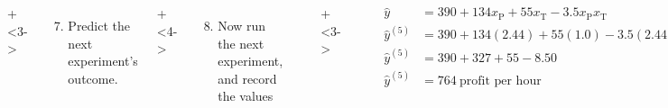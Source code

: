 \begin{frame}
	\vspace{-1.1cm}
	\begin{columns}[T]

			\vspace{1cm}
			\onslide+<3->{
				{\tiny 
					\begin{enumerate}\setcounter{enumi}{6}
						\item	Predict the next experiment's outcome.
					\end{enumerate}
				
				\par}
			}
			
			\vspace{2cm}
			\onslide+<4->{
				{\tiny 
					\begin{enumerate}\setcounter{enumi}{7}
						\item	Now run the next experiment, and record the values
					\end{enumerate}
				
				\par}
			}
			
			\rule[3mm]{0.01cm}{85mm}%
			
			
			\vspace{1cm}
			
			
			
			\onslide+<3->{	
				\hrule
				
				\begin{align*}
					\hat{y} &= 390 + 134 x_\text{P} + 55 x_\text{T} - 3.5x_\text{P}x_\text{T} \\
					\hat{y}^{(5)} &= 390 + 134 (2.44) + 55 (1.0) - 3.5(2.44)(1.0)\\
					\hat{y}^{(5)} &= 390 + 327 + 55 - 8.50\\
					\hat{y}^{(5)} &= 764~\text{profit per hour}
				\end{align*}
			}
			
			\vspace{-1.15cm}
			\onslide+<4->{	
				\begin{align*}
					y^{(5)} &= \$669~\text{profit per hour}
				\end{align*}
			}
	\end{columns}
\end{frame}

